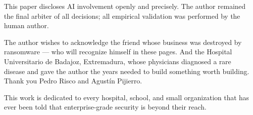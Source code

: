 \documentclass[11pt,a4paper]{article}
\begin{document}
    This paper discloses AI involvement openly and precisely. The author remained the final
    arbiter of all decisions; all empirical validation was performed by the human author.

    The author wishes to acknowledge the friend whose business was destroyed by ransomware ---
    who will recognize himself in these pages. And the Hospital Universitario de Badajoz, Extremadura, whose
    physicians diagnosed a rare disease and gave the author the years needed to build something
    worth building. Thank you Pedro Risco and Agustín Pijierro.

    \medskip
    \noindent This work is dedicated to every hospital, school, and small organization that has
    ever been told that enterprise-grade security is beyond their reach.


    
    
\end{document}
